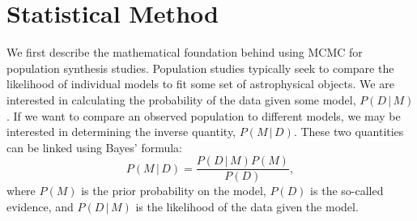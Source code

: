 \documentclass[12pt, preprint]{aastex}
\newcommand{\given}{\,|\,}
\begin{document}

\section{Statistical Method}

We first describe the mathematical foundation behind using MCMC for population synthesis studies. Population studies typically seek to compare the likelihood of individual models to fit some set of astrophysical objects. We are interested in calculating the probability of the data given some model, $P(D \given M)$. If we want to compare an observed population to different models, we may be interested in determining the inverse quantity, $P(M \given D)$. These two quantities can be linked using Bayes' formula:
\begin{equation}
P(M \given D) = \frac{P(D \given M) P(M)}{P(D)}, \label{eq:bayes}
\end{equation}
where $P(M)$ is the prior probability on the model, $P(D)$ is the so-called evidence, and $P(D \given M)$ is the likelihood of the data given the model. 
\end{document}
